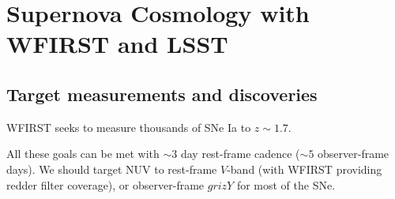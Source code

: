 %
%

\section{Supernova Cosmology with WFIRST and LSST}
\def\secname{\chpname:supernovae}\label{sec:\secname}


%


\subsection{Target measurements and discoveries}
\label{sec:\secname:targets}

%

WFIRST seeks to measure thousands of SNe Ia to $z \sim 1.7$. 

All these goals can be met with $\sim 3$ day rest-frame cadence ($\sim 5$ observer-frame days). We should target NUV to rest-frame $V$-band (with WFIRST providing redder filter coverage), or observer-frame $grizY$ for most of the SNe.

